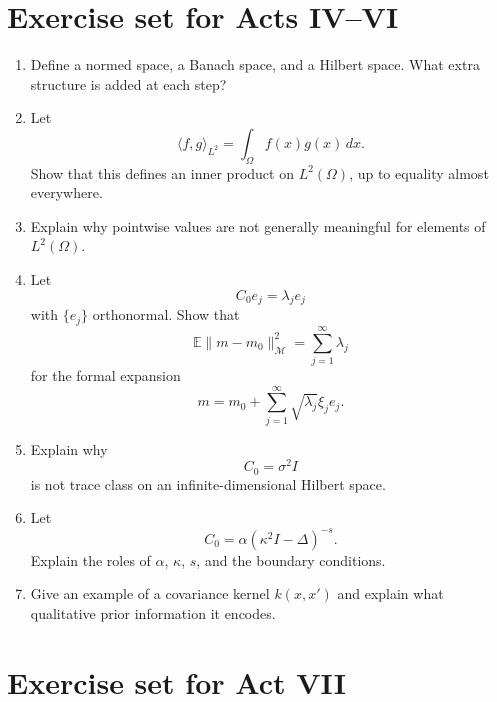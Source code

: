 \documentclass[11pt,a4paper]{book}
\newcommand{\M}{\mathcal{M}}      %
\begin{document}
\section{Exercise set for Acts IV--VI}

\begin{enumerate}[label=\textbf{IV--VI.\arabic*.}]
    \item Define a normed space, a Banach space, and a Hilbert space. What extra
    structure is added at each step?

    \item Let
    \[
        \langle f,g\rangle_{L^2}
        =
        \int_\Omega f(x)g(x)\,dx.
    \]
    Show that this defines an inner product on $L^2(\Omega)$, up to equality
    almost everywhere.

    \item Explain why pointwise values are not generally meaningful for
    elements of $L^2(\Omega)$.

    \item Let
    \[
        C_0e_j=\lambda_j e_j
    \]
    with $\{e_j\}$ orthonormal. Show that
    \[
        \mathbb{E}\|m-m_0\|_{\M}^2
        =
        \sum_{j=1}^{\infty}\lambda_j
    \]
    for the formal expansion
    \[
        m=m_0+\sum_{j=1}^{\infty}\sqrt{\lambda_j}\xi_j e_j.
    \]

    \item Explain why
    \[
        C_0=\sigma^2 I
    \]
    is not trace class on an infinite-dimensional Hilbert space.

    \item Let
    \[
        C_0=\alpha(\kappa^2I-\Delta)^{-s}.
    \]
    Explain the roles of $\alpha$, $\kappa$, $s$, and the boundary conditions.

    \item Give an example of a covariance kernel $k(x,x')$ and explain what
    qualitative prior information it encodes.
\end{enumerate}

\section{Exercise set for Act VII}
\end{document}
